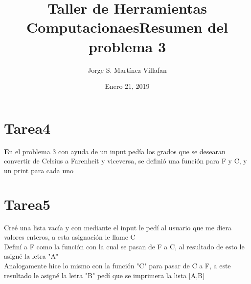 \documentclass[letterpaper, 12pt, oneside]{article}%
\title{\Huge Taller de Herramientas Computacionaes}
\author{Jorge S. Martínez Villafan}
\date{Enero 21, 2019}
\begin{document}
\maketitle
\newpage
\title{Resumen del problema 3}
\section{Tarea4}
\textbf En el problema 3 con ayuda de un input pedía los grados que se desearan convertir de Celsius a Farenheit y viceversa, se definió  una función para F y C, y un print para cada uno


\section{Tarea5}
Creé una lista vacía y con mediante el input le pedí al usuario que me diera valores enteros, a esta asignación le llame C\\
Definí a F como la función con la cual se pasan de F a C, al resultado de esto le asigné la letra \color{red} "A" \\
\color{black} Analogamente hice lo mismo con la función "C" para pasar de C a F, a este resultado le asigné la letra \color{red} "B" \color{black} pedí que se imprimera la lista [A,B]
\end{document}
